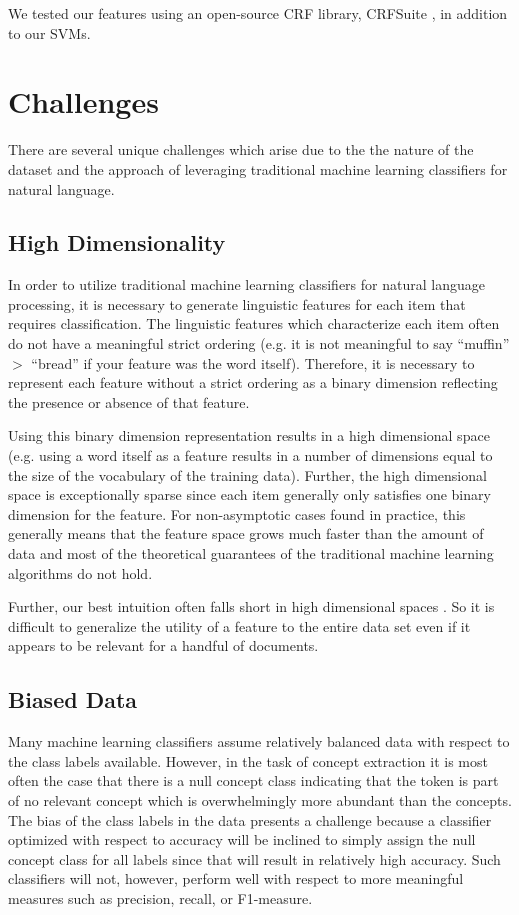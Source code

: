 \documentclass[preprint]{style}
\begin{document}
We tested our features using an open-source CRF library, CRFSuite \cite{crfsuite}, in addition to our SVMs.

\section{Challenges}
There are several unique challenges which arise due to the the nature of the dataset and the approach of leveraging traditional machine learning classifiers for natural language.

\subsection{High Dimensionality}
In order to utilize traditional machine learning classifiers for natural language processing, it is necessary to generate linguistic features for each item that requires classification. The linguistic features which characterize each item often do not have a meaningful strict ordering (e.g. it is not meaningful to say ``muffin'' $>$ ``bread'' if your feature was the word itself). Therefore, it is necessary to represent each feature without a strict ordering as a binary dimension reflecting the presence or absence of that feature.

Using this binary dimension representation results in a high dimensional space (e.g. using a word itself as a feature results in a number of dimensions equal to the size of the vocabulary of the training data). Further, the high dimensional space is exceptionally sparse since each item generally only satisfies one binary dimension for the feature. For non-asymptotic cases found in practice, this generally means that the feature space grows much faster than the amount of data and most of the theoretical guarantees of the traditional machine learning algorithms do not hold.

Further, our best intuition often falls short in high dimensional spaces \cite{dimensions}. So it is difficult to generalize the utility of a feature to the entire data set even if it appears to be relevant for a handful of documents.

\subsection{Biased Data}
Many machine learning classifiers assume relatively balanced data with respect to the class labels available. However, in the task of concept extraction it is most often the case that there is a null concept class indicating that the token is part of no relevant concept which is overwhelmingly more abundant than the concepts. The bias of the class labels in the data presents a challenge because a classifier optimized with respect to accuracy will be inclined to simply assign the null concept class for all labels since that will result in relatively high accuracy. Such classifiers will not, however, perform well with respect to more meaningful measures such as precision, recall, or F1-measure.
\end{document}
